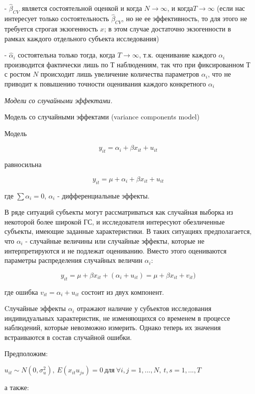 \documentclass[a4paper,8pt]{article} %
\begin{document}
- $\hat{\beta}_{CV}$ является состоятельной оценкой и когда $N\to \infty $, и  когда$T\to \infty $ (если нас интересует только состоятельность $\hat{\beta}_{CV}$, но
не ее эффективность, то для этого не требуется строгая экзогенность $ x$;  в этом случае достаточно экзогенности в рамках каждого отдельного субъекта исследования)


- $\hat{\alpha}_{i}$  состоятельна только тогда, когда   $T\to \infty $, т.к. оценивание каждого $\alpha_{i}$ производится фактически лишь по $Т$ наблюдениям, так что при фиксированном $Т$ с ростом $N$ происходит лишь увеличение количества параметров  $\alpha_{i}$, что не приводит к повышению точности оценивания каждого конкретного $\alpha_{i}$



\textit{Модели со случайными эффектами. }


 Модель со случайными эффектами (variance components model)

Модель

$$ y_{it} = \alpha_i + \beta x_{it} + u_{it} $$

равносильна

$$ y_{it}  = \mu + \alpha_i + \beta x_{it}+ u_{it}$$ 

где  $\sum \alpha_i = 0 $, $ \alpha_i $ - дифференциальные эффекты. 

В ряде ситуаций субъекты могут  рассматриваться  как случайная выборка из некоторой более широкой ГС, и исследователя интересуют обезличенные субъекты, имеющие заданные характеристики. В таких ситуациях предполагается, что $\alpha_i$ -   случайные  величины или случайные эффекты, которые не интерпретируются и не подлежат оцениванию. Вместо этого оцениваются параметры
распределения случайных величин $\alpha_i$:

$$ y_{it}  = \mu +  \beta x_{it}+ (\alpha_i +  u_{it}) = \mu +  \beta x_{it}+ v_{it}) $$ 

где ошибка $v_{it} = \alpha_i +  u_{it} $  состоит из двух компонент.  

Cлучайные эффекты $\alpha_i$ отражают наличие у субъектов исследования индивидуальных характеристик, не изменяющихся со временем в процессе наблюдений, которые невозможно измерить. Однако теперь  их
значения встраиваются в состав случайной ошибки.


Предположим: 

$u_{it} \sim N(0, \sigma^2_u), \  E(x_{it}u_{js}) = 0 \ для \ \forall  i , j = 1, ..., N, \ t, s = 1, ..., T $ 

а также:
\end{document}
